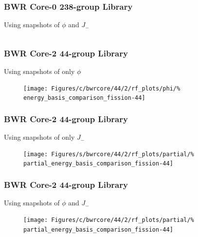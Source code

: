 \documentclass[fleqn]{beamer}
\begin{document}
  \begin{frame}
      \frametitle{BWR Core-0 238-group Library}
      \centering
      Using snapshots of $\phi$ and $J_-$
      \begin{figure}
          \begin{columns}[T]
              \begin{column}{0.5\textwidth}
              \end{column}
              \begin{column}{0.5\textwidth}
              \end{column}
          \end{columns}
      \end{figure}
  \end{frame}
  
  \begin{frame}
    \frametitle{BWR Core-2 44-group Library}
    \centering
    Using snapshots of only $\phi$
    \begin{figure}
    \texttt{[image: Figures/c/bwrcore/44/2/rf\_plots/phi/\%
        energy\_basis\_comparison\_fission-44]}
    \end{figure}
  \end{frame}
  
  \begin{frame}
    \frametitle{BWR Core-2 44-group Library}
    \centering
    Using snapshots of only $J_-$
    \begin{figure}
    \texttt{[image: Figures/s/bwrcore/44/2/rf\_plots/partial/\%
        partial\_energy\_basis\_comparison\_fission-44]}
    \end{figure}
  \end{frame}
  
  \begin{frame}
    \frametitle{BWR Core-2 44-group Library}
    \centering
    Using snapshots of $\phi$ and $J_-$
    \begin{figure}
    \texttt{[image: Figures/c/bwrcore/44/2/rf\_plots/partial/\%
        partial\_energy\_basis\_comparison\_fission-44]}
    \end{figure}
  \end{frame}
  
\end{document}
